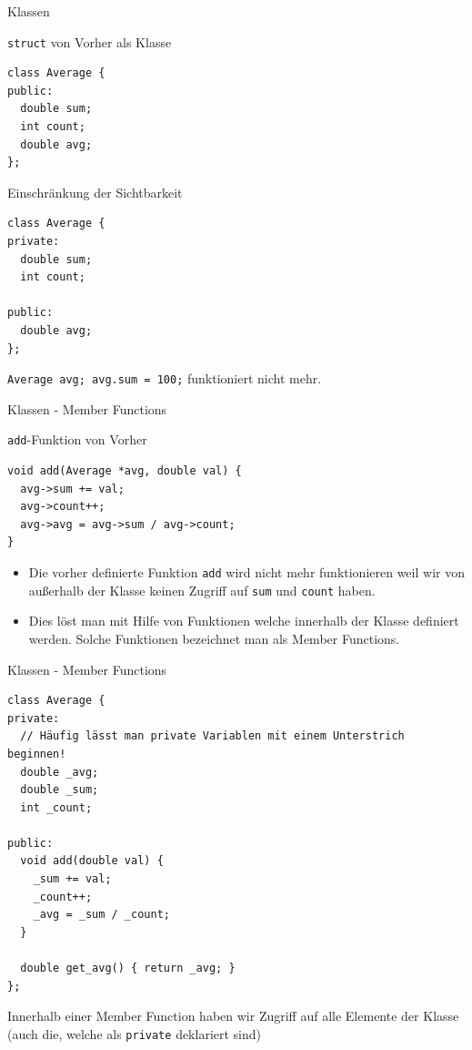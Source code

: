 \documentclass[presentation]{beamer}
\begin{document}
\begin{frame}[fragile,label={sec:org03ec5ee}]{Klassen}
 \begin{exampleblock}{{\color{solarizedYellow}\texttt{struct} }von Vorher als Klasse}
\begin{verbatim}
class Average {
public:
  double sum;
  int count;
  double avg;
};
\end{verbatim}
\end{exampleblock}
\begin{exampleblock}{Einschränkung der Sichtbarkeit}
\begin{verbatim}
class Average {
private:
  double sum;
  int count;

public:
  double avg;
};
\end{verbatim}
{\color{solarizedYellow}\texttt{Average avg; avg.sum = 100;} }funktioniert nicht mehr.
\end{exampleblock}
\end{frame}
\begin{frame}[fragile,label={sec:orgc774a48}]{Klassen - Member Functions}
 \begin{exampleblock}{{\color{solarizedYellow}\texttt{add}}-Funktion von Vorher}
\begin{verbatim}
void add(Average *avg, double val) {
  avg->sum += val;
  avg->count++;
  avg->avg = avg->sum / avg->count;
}
\end{verbatim}
\end{exampleblock}
\begin{itemize}
\item Die vorher definierte Funktion {\color{solarizedYellow}\texttt{add} }wird nicht mehr funktionieren
weil wir von außerhalb der Klasse keinen Zugriff auf {\color{solarizedYellow}\texttt{sum} }und
{\color{solarizedYellow}\texttt{count} }haben.

\item Dies löst man mit Hilfe von Funktionen welche innerhalb der Klasse
definiert werden. Solche Funktionen bezeichnet man als \alert{Member
Functions}.
\end{itemize}
\end{frame}
\begin{frame}[fragile,label={sec:orgb05780d}]{Klassen - Member Functions}
 \begin{verbatim}
class Average {
private:
  // Häufig lässt man private Variablen mit einem Unterstrich beginnen!
  double _avg;
  double _sum;
  int _count;

public:
  void add(double val) {
    _sum += val;
    _count++;
    _avg = _sum / _count;
  }

  double get_avg() { return _avg; }
};
\end{verbatim}
Innerhalb einer Member Function haben wir Zugriff auf \alert{alle Elemente}
der Klasse (auch die, welche als {\color{solarizedYellow}\texttt{private} }deklariert sind)
\end{frame}
\end{document}
